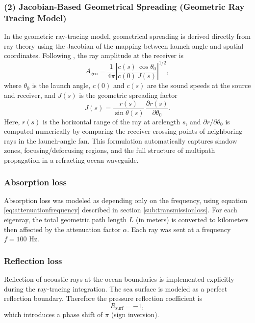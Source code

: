 \documentclass[fleqn]{jaes}
\begin{document}
\subsubsection*{(2) Jacobian-Based Geometrical Spreading (Geometric Ray Tracing Model)}
In the geometric ray-tracing model, geometrical spreading is derived directly from ray theory using the Jacobian of the mapping between launch angle and spatial coordinates. Following \cite{Jensen}, the ray amplitude at the receiver is
\begin{equation}
    A_{\text{geo}} = \frac{1}{4\pi}\left|\frac{c(s)\,\cos\theta_0}{c(0)\,J(s)}\right|^{1/2},
\end{equation}
where $\theta_0$ is the launch angle, $c(0)$ and $c(s)$ are the sound speeds at the source and receiver, and $J(s)$ is the geometric spreading factor
\begin{equation}
    J(s) = \frac{r(s)}{\sin\theta(s)}\,\frac{\partial r(s)}{\partial\theta_0}.
\end{equation} 
Here, $r(s)$ is the horizontal range of the ray at arclength $s$, and $\partial r / \partial\theta_0$ is computed numerically by comparing the receiver crossing points of neighboring rays in the launch-angle fan. This formulation automatically captures shadow zones, focusing/defocusing regions, and the full structure of multipath propagation in a refracting ocean waveguide.

\subsubsection{Absorption loss}
Absorption loss was modeled as depending only on the frequency, using equation \ref{eq:attenuationfrequency} described in section \ref{sub:transmissionloss}. For each eigenray, the total geometric path length $L$ (in meters) is converted to kilometers then affected by the attenuation factor $\alpha$. Each ray was sent at a frequency $f=100$ Hz.

\subsubsection{Reflection loss}
Reflection of acoustic rays at the ocean boundaries is implemented explicitly during the ray-tracing integration. The sea surface is modeled as a perfect reflection boundary. Therefore the pressure reflection coefficient is
\begin{equation}
    R_{\text{surf}} = -1,
\end{equation}
which introduces a phase shift of $\pi$ (sign inversion).
\end{document}
